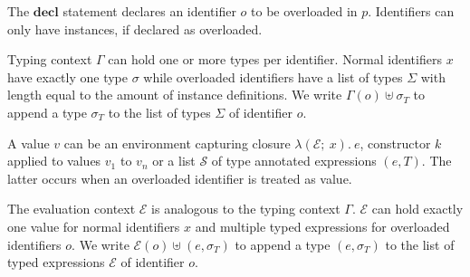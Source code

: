 \documentclass[runningheads]{llncs}
\begin{document}
The $\textbf{decl}$ statement declares an identifier $o$ to be overloaded in $p$. 
Identifiers can only have instances, if declared as overloaded.

Typing context $\Gamma$ can hold one or more types per identifier. 
Normal identifiers $x$ have exactly one type $\sigma$ while overloaded identifiers have a list of types $\Sigma$ with length equal to the amount of instance definitions. 
We write $\Gamma(o) \uplus \sigma_T$ to append a type $\sigma_T$ to the list of types $\Sigma$ of identifier $o$.

A value $v$ can be an environment capturing closure $\lambda (\mathcal{E}; \ x). \ e$, constructor $k$ applied to values $v_1$ to $v_n$ or a list $\mathcal{S}$ of type annotated expressions $(e, T)$. The latter occurs when an overloaded identifier is treated as value. 

The evaluation context $\mathcal{E}$ is analogous to the typing context $\Gamma$. 
$\mathcal{E}$ can hold exactly one value for normal identifiers $x$ and multiple typed expressions for overloaded identifiers $o$. 
We write $\mathcal{E}(o) \uplus (e, \sigma_T)$ to append a type $(e, \sigma_T)$ to the list of typed expressions $\mathcal{E}$ of identifier $o$.
\end{document}
